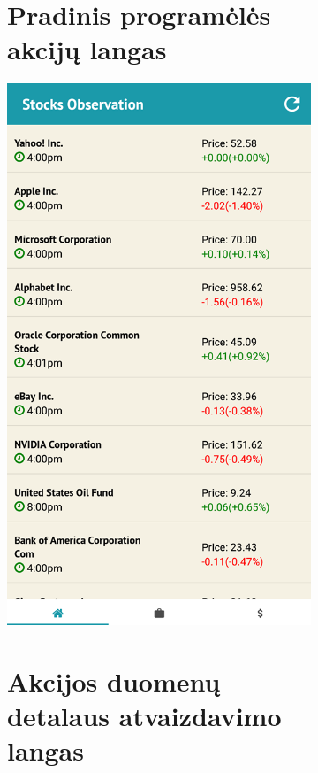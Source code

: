 \documentclass[a4paper,12pt,fleqn]{article}
\begin{document}
\begin{appendices}
\begin{figure}[t!]
	\begin{subfigure}{0.5\textwidth}
		\centering
		\tocless\section{Pradinis programėlės akcijų langas}
		\includegraphics[width=0.7\linewidth]{home.png}
		\label{app:priedas7}
	\end{subfigure}
	\begin{subfigure}{0.5\textwidth}
		\centering
		\tocless\section{Akcijos duomenų detalaus atvaizdavimo langas}

\end{subfigure}
\end{figure}
\end{appendices}
\end{document}
